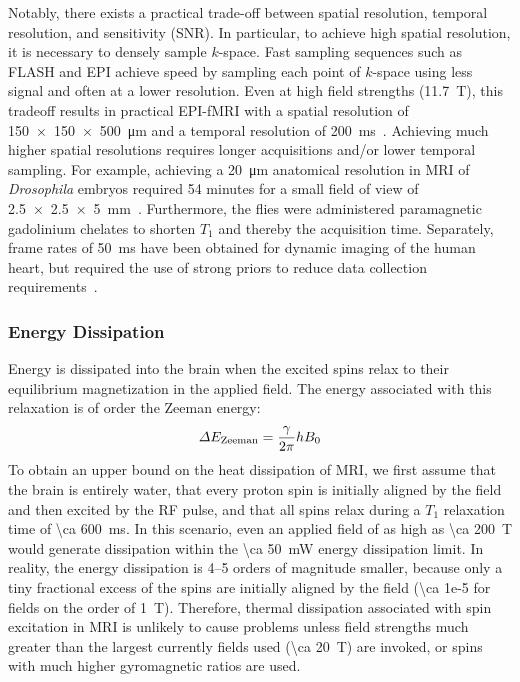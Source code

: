 Notably, there exists a practical trade-off between spatial resolution, temporal resolution, and sensitivity (SNR). In particular, to achieve high spatial resolution, it is necessary to densely sample $k$-space.
Fast sampling sequences such as FLASH and EPI achieve speed by sampling each point of $k$-space using less signal and often at a lower resolution.
Even at high field strengths (\SI{11.7}{\tesla}), this tradeoff results in practical EPI-fMRI with a spatial resolution of \SI{150 x 150 x 500}{\micro\meter} and a temporal resolution of \SI{200}{\milli\second}~\cite{yu12}.
Achieving much higher spatial resolutions requires longer acquisitions and/or lower temporal sampling.
For example, achieving a \SI{20}{\micro\meter} anatomical resolution in MRI of \emph{Drosophila} embryos required 54 minutes for a small field of view of \SI{2.5 x 2.5 x 5}{\milli\meter}~\cite{null08}.
Furthermore, the flies were administered paramagnetic gadolinium chelates to shorten $T_1$ and thereby the acquisition time.
Separately, frame rates of \SI{50}{\milli\second} have been obtained for dynamic imaging of the human heart, but required the use of strong priors to reduce data collection requirements~\cite{zhang10}.

\subsubsection{Energy Dissipation}

Energy is dissipated into the brain when the excited spins relax to their equilibrium magnetization in the applied field.
The energy associated with this relaxation is of order the Zeeman energy:
\[\Delta E_{\text{\scriptsize Zeeman}} = \frac{\gamma}{2\pi} h B_0\]
To obtain an upper bound on the heat dissipation of MRI, we first assume that the brain is entirely water, that every proton spin is initially aligned by the field and then excited by the RF pulse, and that all spins relax during a $T_1$ relaxation time of \SI{\ca 600}{\ms}.
In this scenario, even an applied field of as high as \SI{\ca 200}{\tesla} would generate dissipation within the \SI{\ca 50}{\milli\watt} energy dissipation limit.
In reality, the energy dissipation is 4--5 orders of magnitude smaller, because only a tiny fractional excess of the spins are initially aligned by the field (\num{\ca 1e-5} for fields on the order of \SI{1}{\tesla}).
Therefore, thermal dissipation associated with spin excitation in MRI is unlikely to cause problems unless field strengths much greater than the largest currently fields used (\SI{\ca 20}{\tesla}) are invoked, or spins with much higher gyromagnetic ratios are used.

